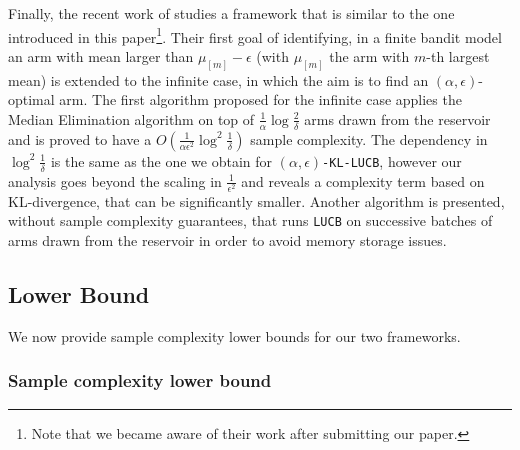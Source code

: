Finally, the recent work of \cite{Chaudhuri2017PACIO} studies a framework that is similar to the one introduced in this paper\footnote{Note that we became aware of their work after submitting our paper.}. Their first goal of identifying, in a finite bandit model an arm with mean larger than $\mu_{[m]} - \epsilon$ (with $\mu_{[m]}$ the arm with $m$-th largest mean) is extended to the infinite case, in which the aim is to find an $(\alpha,\epsilon)$-optimal arm. 
The first algorithm proposed for the infinite case applies the Median Elimination algorithm \citep{EvenDaral06} on top of
$\frac{1}{\alpha}\log\frac{2}{\delta}$ 
arms drawn from the reservoir and is proved to have a
$O\left(\frac{1}{\alpha\epsilon^2} \log^2\frac{1}{\delta}\right)$
sample complexity. The dependency in $\log^2\frac{1}{\delta}$ is the same as the one we obtain for \texttt{$(\alpha,\epsilon)$-KL-LUCB}, however our analysis goes beyond the scaling in $\frac{1}{\epsilon^2}$ and reveals a complexity term based on KL-divergence, that can be significantly smaller. %
Another algorithm is presented, without sample complexity guarantees,
that runs \texttt{LUCB} on successive batches of arms drawn from the reservoir in order to avoid memory storage issues.




\subsection{Lower Bound}\label{sec-fc-lower}

We now provide sample complexity lower bounds for our two frameworks.

\subsubsection{Sample complexity lower bound}\label{sec-fc-lower-stmt}

